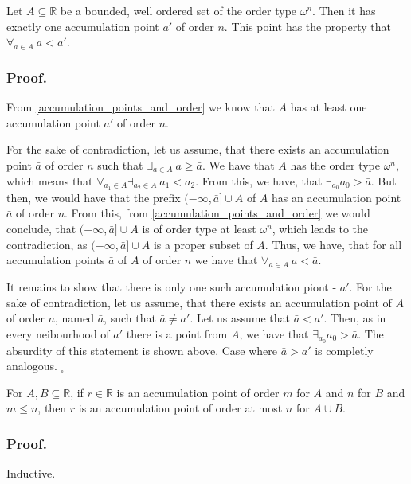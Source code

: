 \begin{corollary}\label{that_important_corollary}
Let $A \subseteq \mathbb{R}$ be a bounded, well ordered set of the order type $\omega^n$. Then 
it has exactly one accumulation point $a'$ of order $n$. This point has the property that 
$\forall_{a\in A}\ a<a'$.  
\end{corollary}
\subsubsection{Proof.} 
From \ref{accumulation_points_and_order} we know that $A$ has at least one accumulation point 
$a'$ of order $n$. 

For the sake of contradiction, let us assume, that there exists an accumulation 
point $\bar{a}$ of order $n$ such that $\exists_{a\in A}\ a\geq \bar{a}$. We have that $A$ has 
the order type $\omega^n$, which means that $\forall_{a_1\in A}\exists_{a_2 \in A}\ a_1 < a_2$. 
From this, we have, that $\exists_{a_0} a_0 > \bar{a}$. But then, we would have that the prefix 
$(-\infty, \bar{a}] \cup A$ of $A$ has an accumulation point $\bar{a}$ of order $n$. 
From this, from \ref{accumulation_points_and_order} we would conclude, 
that $(-\infty, \bar{a}] \cup A$ is of 
order type at least $\omega^n$, which leads to the contradiction, as $(-\infty, \bar{a}] \cup A$ 
is a proper subset of $A$. Thus, we have, that for all accumulation points $\bar{a}$ of $A$ of 
order $n$ we have that $\forall_{a\in A}\ a<\bar{a}$. 

It remains to show that there is only one 
such accumulation piont - $a'$. For the sake of contradiction, let us assume, that 
there exists an accumulation point of $A$ of order $n$, named $\bar{a}$, such that 
$\bar{a} \neq a'$. Let us assume that $\bar{a} < a'$. Then, as in every neibourhood 
of $a'$ there is a point from $A$, we have 
that $\exists_{a_0} a_0 > \bar{a}$. The absurdity of this statement is shown above. 
Case where $\bar{a} > a'$ is completly analogous. $_\square$


\begin{lemma}\label{The order does not grow lemma}
For $A, B \subseteq \mathbb{R}$, if $r \in \mathbb{R}$ is an accumulation point 
of order $m$ for $A$ and $n$ for $B$ and $m \leq n$, then $r$ 
is an accumulation point of order at most $n$ for $A \cup B$.  
\end{lemma}%
\subsubsection{Proof.}
Inductive. 

